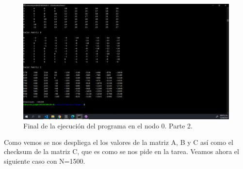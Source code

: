 \documentclass[11pt]{article}
\begin{document}
		\begin{figure}[H]
			\centering
			\includegraphics[scale=0.34]{resources/nodo0final2n10.png}
			\caption{Final de la ejecución del programa en el nodo 0. Parte 2.}\label{fig:picture}
		\end{figure}
		Como vemos se nos despliega el los valores de la matriz A, B y C así como el checksum de la matriz C, que es como se nos pide en la tarea. Veamos ahora el siguiente caso con N=1500.
\end{document}
